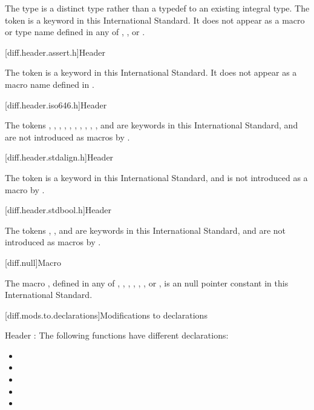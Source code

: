 \pnum
The type  is a distinct type rather than a typedef to an
existing integral type.
The token 
is a keyword in this International Standard.
It does not appear as a macro or type name defined in any of
,
,
or .

[diff.header.assert.h]{Header }
%

\pnum
The token  is a keyword in this International
Standard. It does not appear as a macro name defined
in .

[diff.header.iso646.h]{Header }

\pnum
The tokens
,
,
,
,
,
,
,
,
,
,
and
are keywords in this International
Standard,
and are not introduced as macros
by .

[diff.header.stdalign.h]{Header }
%

\pnum
The token  is a keyword in this International
Standard,
and is not introduced as a macro
by .

[diff.header.stdbool.h]{Header }
%

\pnum
The tokens , , and 
are keywords in this International Standard,
and are not introduced as macros
by .

[diff.null]{Macro }

\pnum
The macro
,
defined in any of
,
,
,
,
,
,
or ,
is an  \Cpp{} null pointer constant in
this International Standard.

[diff.mods.to.declarations]{Modifications to declarations}

\pnum
Header :
The following functions have different declarations:

\begin{itemize}
\item {}
\item {}
\item {}
\item {}
\item {}
\end{itemize}

